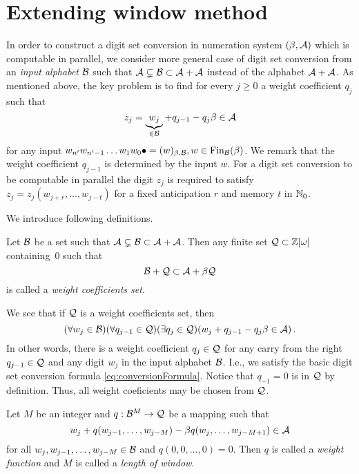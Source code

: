 \section{Extending window method}
\label{sec:methodDescription}
In order to construct a digit set conversion in numeration system $(\beta,\mathcal{A})$ which is computable in parallel, we consider more general case of digit set conversion from an \emph{input alphabet} $\mathcal{B}$ such that $\mathcal{A} \subsetneq \mathcal{B} \subset \mathcal{A} +\mathcal{A}$ instead of the alphabet $\mathcal{A}+\mathcal{A}$.
As mentioned above, the key problem is to find for every $j\geq 0$ a weight coefficient $q_j$ such that 
    $$
        z_j=\underbrace{w_j}_{\in \mathcal{B}} + q_{j-1} - q_j \beta \in \mathcal{A} 
    $$  
    for any input $w_{n'}w_{n'-1}\dots w_1 w_0 \bullet=(w)_{\beta,\mathcal{B}}, w\in \text{Fin}_{\mathcal{B}}(\beta)$. We remark that the weight coefficient $q_{j-1}$ is determined by the input $w$. For a digit set conversion to be computable in parallel the digit $z_j$ is required to satisfy $z_j=z_j(w_{j+r},\dots,w_{j-t})$ for a fixed anticipation $r$ and memory $t$ in $\mathbb{N}_0$.
    
    We introduce following definitions. 
    \begin{defn}
    \label{def:weightCoefficientsSet}
        Let $\mathcal{B}$ be a set such that $\mathcal{A} \subsetneq \mathcal{B} \subset \mathcal{A} +\mathcal{A}$. Then any finite set $\mathcal{Q}\subset\mathbb{Z}[\omega]$ containing~0 such that 
        $$
            \mathcal{B} + \mathcal{Q} \subset \mathcal{A} + \beta \mathcal{Q}
        $$  
        is called a \emph{weight coefficients set}.
    \end{defn}
    We see that if $\mathcal{Q}$ is a weight coefficients set, then
        $$
        (\forall w_j \in \mathcal{B})(\forall q_{j-1}\in\mathcal{Q})(\exists q_j \in \mathcal{Q} )(w_j + q_{j-1} - q_j \beta \in \mathcal{A} )\,.
        $$
    In other words, there is a weight coefficient $q_j \in \mathcal{Q}$ for any carry from the right $q_{j-1}\in \mathcal{Q}$ and any digit $w_j$ in the input alphabet $\mathcal{B}$. I.e., we  satisfy the basic digit set conversion formula \eqref{eq:conversionFormula}. Notice that $q_{-1}=0$ is in $\mathcal{Q}$ by definition. Thus, all weight coeficients may be chosen from $\mathcal{Q}$.
    \begin{defn}
    Let $M$ be an integer and $q:\mathcal{B}^{M} \rightarrow \mathcal{Q}$ be a mapping such that 
    $$
    w_j+ q(w_{j-1}, \dots, w_{j-M}) - \beta q(w_j, \dots, w_{j-M+1}) \in \mathcal{A}
    $$
    for all $w_j,w_{j-1}, \dots, w_{j-M} \in \mathcal{B}$ and $q(0,0,\dots,0)=0$. Then $q$ is called a \emph{weight function} and $M$ is called a \emph{length of window}.    
    \end{defn}

